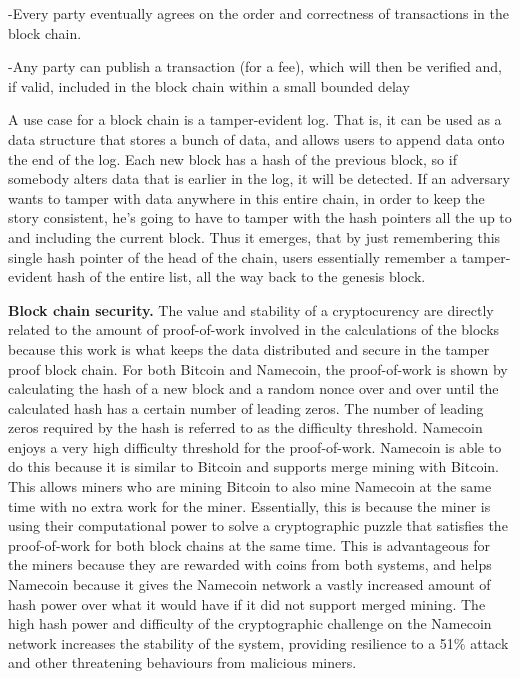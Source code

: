 -Every party eventually agrees on the order and correctness of transactions in the block chain.

-Any party can publish a transaction (for a fee), which will then be verified and, if valid, included in the block chain within a small bounded delay

A use case for a block chain is a tamper-evident log. That is, it can be used as a data structure that stores a bunch of data, and allows users to append data onto the end of the log. Each new block has a hash of the previous block, so if somebody alters data that is earlier in the log, it will be detected. If an adversary wants to tamper with data anywhere in this entire chain, in order to keep the story consistent, he's going to have to tamper with the hash pointers all the up to and including the current block. Thus it emerges, that by just remembering this single hash pointer of the head of the chain, users essentially remember a tamper-evident hash of the entire list, all the way back to the genesis block. 


{\bf Block chain security.}
The value and stability of a cryptocurency are directly related to the amount of proof-of-work involved in the calculations of the blocks because this work is what keeps the data distributed and secure in the tamper proof block chain. For both Bitcoin and Namecoin, the proof-of-work is shown by calculating the hash of a new block and a random nonce over and over until the calculated hash has a certain number of leading zeros. The number of leading zeros required by the hash is referred to as the difficulty threshold. Namecoin enjoys a very high difficulty threshold for the proof-of-work. Namecoin is able to do this because it is similar to Bitcoin and supports merge mining with Bitcoin. This allows miners who are mining Bitcoin to also mine Namecoin at the same time with no extra work for the miner. Essentially, this is because the miner is using their computational power to solve a cryptographic puzzle that satisfies the proof-of-work for both block chains at the same time. This is advantageous for the miners because they are rewarded with coins from both systems, and helps Namecoin because it gives the Namecoin network a vastly increased amount of hash power over what it would have if it did not support merged mining. The high hash power and difficulty of the cryptographic challenge on the Namecoin network increases the stability of the system, providing resilience to a 51\% attack and other threatening behaviours from malicious miners.

